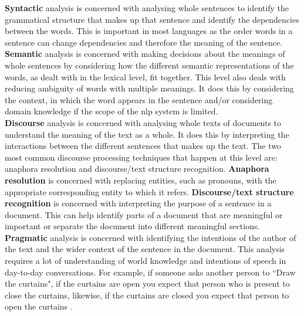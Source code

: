\noindent
\textbf{Syntactic} analysis is concerned with analysing whole sentences to identify the grammatical structure that makes up that sentence and identify the dependencies between the words. This is important in most languages as the order words in a sentence can change dependencies and therefore the meaning of the sentence.\\ 
\textbf{Semantic} analysis is concerned with making decisions about the meanings of whole sentences by considering how the different semantic representations of the words, as dealt with in the lexical level, fit together. This level also deals with reducing ambiguity of words with multiple meanings. It does this by considering the context, in which the word appears in the sentence and/or considering domain knowledge if the scope of the \gls{nlp} system is limited.\\
\textbf{Discourse} analysis is concerned with analysing whole texts of documents to understand the meaning of the text as a whole. It does this by interpreting the interactions between the different sentences that makes up the text. The two most common discourse processing techniques that happen at this level are: anaphora resolution and discourse/text structure recognition. \textbf{Anaphora resolution} is concerned with replacing entities, such as pronouns, with the appropriate corresponding entity to which it refers. \textbf{Discourse/text structure recognition} is concerned with interpreting the purpose of a sentence in a document. This can help identify parts of a document that are meaningful or important or separate the document into different meaningful sections.\\
\textbf{Pragmatic} analysis is concerned with identifying the intentions of the author of the text and the wider context of the sentence in the document. This analysis requires a lot of understanding of world knowledge and intentions of speech in day-to-day conversations. For example, if someone asks another person to ``Draw the curtains", if the curtains are open you expect that person who is present to close the curtains, likewise, if the curtains are closed you expect that person to open the curtains \autocite[example taken from p. 5]{cam-nlp-linguistics}.

